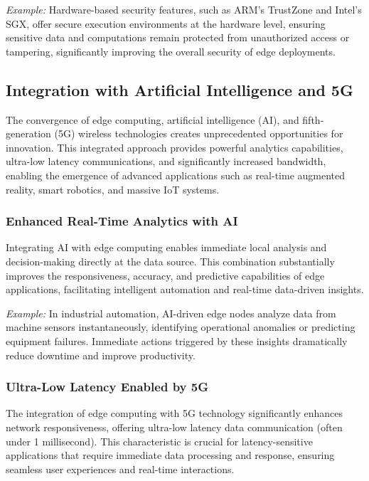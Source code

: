 \documentclass[runningheads]{llncs}
\begin{document}
\noindent\textit{Example:} Hardware-based security features, such as ARM's TrustZone and Intel's SGX, offer secure execution environments at the hardware level, ensuring sensitive data and computations remain protected from unauthorized access or tampering, significantly improving the overall security of edge deployments.


\subsection{Integration with Artificial Intelligence and 5G}

The convergence of edge computing, artificial intelligence (AI), and fifth-generation (5G) wireless technologies creates unprecedented opportunities for innovation. This integrated approach provides powerful analytics capabilities, ultra-low latency communications, and significantly increased bandwidth, enabling the emergence of advanced applications such as real-time augmented reality, smart robotics, and massive IoT systems.

\subsubsection{Enhanced Real-Time Analytics with AI}
Integrating AI with edge computing enables immediate local analysis and decision-making directly at the data source. This combination substantially improves the responsiveness, accuracy, and predictive capabilities of edge applications, facilitating intelligent automation and real-time data-driven insights.

\noindent\textit{Example:} In industrial automation, AI-driven edge nodes analyze data from machine sensors instantaneously, identifying operational anomalies or predicting equipment failures. Immediate actions triggered by these insights dramatically reduce downtime and improve productivity.

\subsubsection{Ultra-Low Latency Enabled by 5G}
The integration of edge computing with 5G technology significantly enhances network responsiveness, offering ultra-low latency data communication (often under 1 millisecond). This characteristic is crucial for latency-sensitive applications that require immediate data processing and response, ensuring seamless user experiences and real-time interactions.
\end{document}

